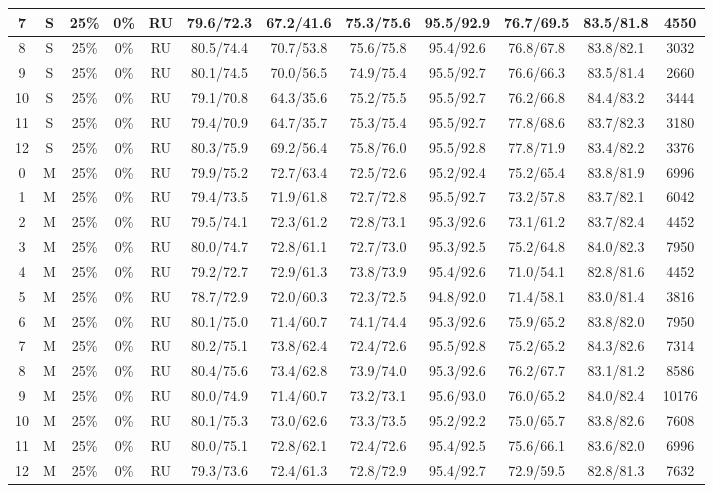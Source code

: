 \begin{table*}
{\begin{tabular}{|c|c|c|c|c||c|c|c|c|c|c||c|}
7 & S & 25\% & 0\% & RU & 79.6/72.3 & 67.2/41.6 & 75.3/75.6 & 95.5/92.9 & 76.7/69.5 & 83.5/81.8 & 4550 \\ \hline
8 & S & 25\% & 0\% & RU & 80.5/74.4 & 70.7/53.8 & 75.6/75.8 & 95.4/92.6 & 76.8/67.8 & 83.8/82.1 & 3032 \\ \hline
9 & S & 25\% & 0\% & RU & 80.1/74.5 & 70.0/56.5 & 74.9/75.4 & 95.5/92.7 & 76.6/66.3 & 83.5/81.4 & 2660 \\ \hline
10 & S & 25\% & 0\% & RU & 79.1/70.8 & 64.3/35.6 & 75.2/75.5 & 95.5/92.7 & 76.2/66.8 & 84.4/83.2 & 3444 \\ \hline
11 & S & 25\% & 0\% & RU & 79.4/70.9 & 64.7/35.7 & 75.3/75.4 & 95.5/92.7 & 77.8/68.6 & 83.7/82.3 & 3180 \\ \hline
12 & S & 25\% & 0\% & RU & 80.3/75.9 & 69.2/56.4 & 75.8/76.0 & 95.5/92.8 & 77.8/71.9 & 83.4/82.2 & 3376 \\ \hline
0 & M & 25\% & 0\% & RU & 79.9/75.2 & 72.7/63.4 & 72.5/72.6 & 95.2/92.4 & 75.2/65.4 & 83.8/81.9 & 6996 \\ \hline
1 & M & 25\% & 0\% & RU & 79.4/73.5 & 71.9/61.8 & 72.7/72.8 & 95.5/92.7 & 73.2/57.8 & 83.7/82.1 & 6042 \\ \hline
2 & M & 25\% & 0\% & RU & 79.5/74.1 & 72.3/61.2 & 72.8/73.1 & 95.3/92.6 & 73.1/61.2 & 83.7/82.4 & 4452 \\ \hline
3 & M & 25\% & 0\% & RU & 80.0/74.7 & 72.8/61.1 & 72.7/73.0 & 95.3/92.5 & 75.2/64.8 & 84.0/82.3 & 7950 \\ \hline
4 & M & 25\% & 0\% & RU & 79.2/72.7 & 72.9/61.3 & 73.8/73.9 & 95.4/92.6 & 71.0/54.1 & 82.8/81.6 & 4452 \\ \hline
5 & M & 25\% & 0\% & RU & 78.7/72.9 & 72.0/60.3 & 72.3/72.5 & 94.8/92.0 & 71.4/58.1 & 83.0/81.4 & 3816 \\ \hline
6 & M & 25\% & 0\% & RU & 80.1/75.0 & 71.4/60.7 & 74.1/74.4 & 95.3/92.6 & 75.9/65.2 & 83.8/82.0 & 7950 \\ \hline
7 & M & 25\% & 0\% & RU & 80.2/75.1 & 73.8/62.4 & 72.4/72.6 & 95.5/92.8 & 75.2/65.2 & 84.3/82.6 & 7314 \\ \hline
8 & M & 25\% & 0\% & RU & 80.4/75.6 & 73.4/62.8 & 73.9/74.0 & 95.3/92.6 & 76.2/67.7 & 83.1/81.2 & 8586 \\ \hline
9 & M & 25\% & 0\% & RU & 80.0/74.9 & 71.4/60.7 & 73.2/73.1 & 95.6/93.0 & 76.0/65.2 & 84.0/82.4 & 10176 \\ \hline
10 & M & 25\% & 0\% & RU & 80.1/75.3 & 73.0/62.6 & 73.3/73.5 & 95.2/92.2 & 75.0/65.7 & 83.8/82.6 & 7608 \\ \hline
11 & M & 25\% & 0\% & RU & 80.0/75.1 & 72.8/62.1 & 72.4/72.6 & 95.4/92.5 & 75.6/66.1 & 83.6/82.0 & 6996 \\ \hline
12 & M & 25\% & 0\% & RU & 79.3/73.6 & 72.4/61.3 & 72.8/72.9 & 95.4/92.7 & 72.9/59.5 & 82.8/81.3 & 7632 \\ \hline
\end{tabular}}
\end{table*}

